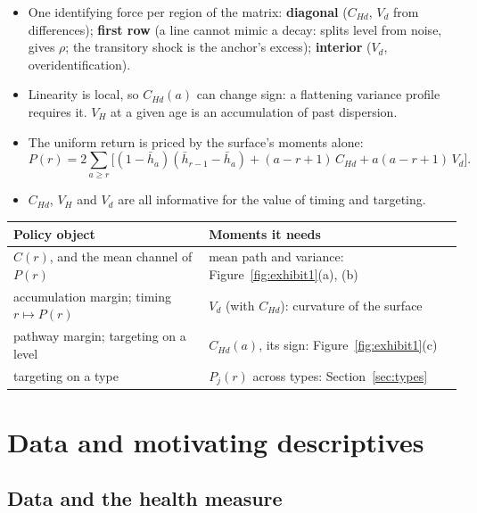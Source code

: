 \documentclass[11pt]{article}
\begin{document}
\begin{itemize}
	\item One identifying force per region of the matrix: \textbf{diagonal} ($C_{Hd}$, $V_d$ from differences); \textbf{first row} (a line cannot mimic a decay: splits level from noise, gives $\rho$; the transitory shock is the anchor's excess); \textbf{interior} ($V_d$, overidentification).
	\item Linearity is local, so $C_{Hd}(a)$ can change sign: a flattening variance profile requires it. $V_H$ at a given age is an accumulation of past dispersion. 
	\item The uniform return is priced by the surface's moments alone:
	\begin{equation}
		P(r)=2\sum_{a\ge r}\bigl[(1-\bar h_a)(\bar h_{r-1}-\bar h_a)+ (a-r+1)\,C_{Hd} + a(a-r+1)\,V_d\bigr].
		\label{eq:Pr}
	\end{equation}
	\item $C_{Hd}$, $V_H$ and $V_d$ are all informative for the value of timing and targeting. 
\end{itemize}

\begin{center}\small
	\begin{tabular}{@{}p{5.6cm}p{6.4cm}@{}}
		\toprule
		Policy object & Moments it needs \\
		\midrule
		$C(r)$, and the mean channel of $P(r)$ & mean path and variance: Figure~\ref{fig:exhibit1}(a), (b) \\
		accumulation margin; timing $r\mapsto P(r)$ & $V_d$ (with $C_{Hd}$): curvature of the surface \\
		pathway margin; targeting on a level & $C_{Hd}(a)$, its sign: Figure~\ref{fig:exhibit1}(c) \\
		targeting on a type & $P_j(r)$ across types: Section~\ref{sec:types} \\
		\bottomrule
	\end{tabular}
\end{center}

\section{Data and motivating descriptives}
\label{sec:data}

\subsection{Data and the health measure}
\end{document}
